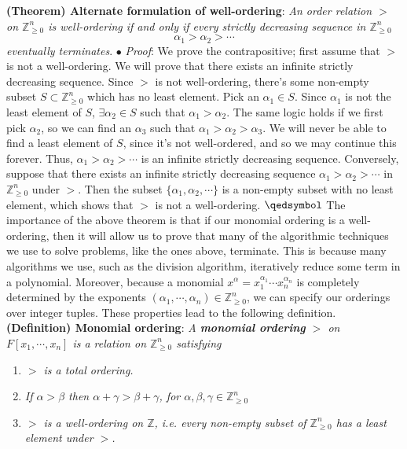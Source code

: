 \documentclass{article}
\begin{document}
\textbf{(Theorem) Alternate formulation of well-ordering}: \textit{An order relation $ > $ on $ \mathbb{Z}_{\geq 0}^n $ is well-ordering if and only if every strictly decreasing sequence in $ \mathbb{Z}_{\geq 0}^n $}
$$ \alpha_1 > \alpha_2 > \cdots $$
\indent \textit{eventually terminates}.
\newline
\indent $ \bullet $ \textit{Proof}: We prove the contrapositive; first assume that $ > $ is not a well-ordering. We will prove that there exists an infinite strictly decreasing sequence. Since $ > $ is not well-ordering, there's some non-empty subset $ S \subset \mathbb{Z}_{\geq 0}^n $ which has no least element.
\newline
Pick an $ \alpha_1 \in S $. Since $ \alpha_1 $ is not the least element of $ S $, $ \exists \alpha_2 \in S $ such that $ \alpha_1 > \alpha_2 $. The same logic holds if we first pick $ \alpha_2 $, so we can find an $ \alpha_3 $ such that $ \alpha_1 > \alpha_2 > \alpha_3 $. We will never be able to find a least element of $ S $, since it's not well-ordered, and so we may continue this forever. Thus, $ \alpha_1 > \alpha_2 > \cdots $ is an infinite strictly decreasing sequence.
\newline
Conversely, suppose that there exists an infinite strictly decreasing sequence $ \alpha_1 > \alpha_2 > \cdots $ in $ \mathbb{Z}_{\geq 0}^n $ under $ > $. Then the subset $ \{ \alpha_1, \alpha_2, \cdots \} $ is a non-empty subset with no least element, which shows that $ > $ is not a well-ordering. $ \qedsymbol $
\newline
The importance of the above theorem is that if our monomial ordering is a well-ordering, then it will allow us to prove that many of the algorithmic techniques we use to solve problems, like the ones above, terminate. This is because many algorithms we use, such as the division algorithm, iteratively reduce some term in a polynomial.
\newline
Moreover, because a monomial $ x^\alpha = x_1^{\alpha_1} \cdots x_n^{\alpha_n} $ is completely determined by the exponents $ (\alpha_1, \cdots, \alpha_n) \in \mathbb{Z}_{\geq 0}^n $, we can specify our orderings over integer tuples. These properties lead to the following definition.
\newline \newline
\textbf{(Definition) Monomial ordering}: \textit{A \textbf{monomial ordering} $ > $ on $ F[x_1, \cdots, x_n] $ is a relation on $ \mathbb{Z}_{\geq 0}^n $ satisfying}
\begin{enumerate}
	\item \textit{$ > $ is a total ordering.}
	\item \textit{If $ \alpha > \beta $ then $ \alpha + \gamma > \beta + \gamma $, for $ \alpha, \beta, \gamma \in \mathbb{Z}_{\geq 0}^n $}
	\item \textit{$ > $ is a well-ordering on $ \mathbb{Z} $, i.e. every non-empty subset of $ \mathbb{Z}_{\geq 0}^n $ has a least element under $ > $.}
\end{enumerate}
\end{document}
